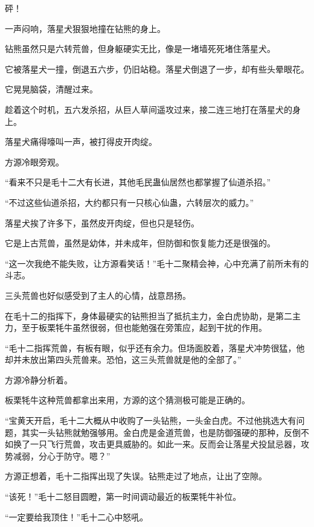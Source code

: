 
\begin{this_body}

砰！

一声闷响，落星犬狠狠地撞在钻熊的身上。

钻熊虽然只是六转荒兽，但身躯硬实无比，像是一堵墙死死堵住落星犬。

它被落星犬一撞，倒退五六步，仍旧站稳。落星犬倒退了一步，却有些头晕眼花。

它晃晃脑袋，清醒过来。

趁着这个时机，五六发杀招，从巨人草间遥攻过来，接二连三地打在落星犬的身上。

落星犬痛得嚎叫一声，被打得皮开肉绽。

方源冷眼旁观。

“看来不只是毛十二大有长进，其他毛民蛊仙居然也都掌握了仙道杀招。”

“不过这些仙道杀招，大约都只有一只核心仙蛊，六转层次的威力。”

落星犬挨了许多下，虽然皮开肉绽，但也只是轻伤。

它是上古荒兽，虽然是幼体，并未成年，但防御和恢复能力还是很强的。

“这一次我绝不能失败，让方源看笑话！”毛十二聚精会神，心中充满了前所未有的斗志。

三头荒兽也好似感受到了主人的心情，战意昂扬。

在毛十二的指挥下，身体最硬实的钻熊担当了抵抗主力，金白虎协助，是第二主力，至于板栗牦牛虽然很弱，但也能勉强在旁策应，起到干扰的作用。

“毛十二指挥荒兽，有板有眼，似乎还有余力。但场面胶着，落星犬冲势很猛，他却并未放出第四头荒兽来。恐怕，这三头荒兽就是他的全部了。”

方源冷静分析着。

板栗牦牛这种荒兽都拿出来用，方源的这个猜测极可能是正确的。

“宝黄天开启，毛十二大概从中收购了一头钻熊，一头金白虎。不过他挑选大有问题，其实一头钻熊就勉强够用。金白虎是金道荒兽，也是防御强硬的那种，反倒不如换了一只飞行荒兽，攻击更具威胁的。如此一来。反而会让落星犬投鼠忌器，攻势减弱，分心于防守。嗯？”

方源正想着，毛十二指挥出现了失误。钻熊走过了地点，让出了空隙。

“该死！”毛十二怒目圆瞪，第一时间调动最近的板栗牦牛补位。

“一定要给我顶住！”毛十二心中怒吼。


\end{this_body}
